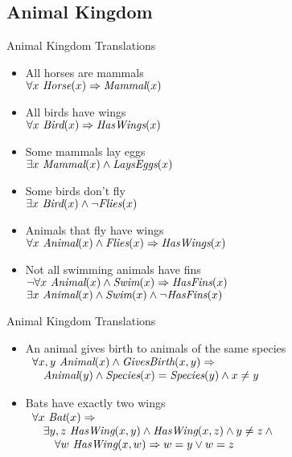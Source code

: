 \documentclass[12pt]{beamer}
\newcommand{\EM}[1]{\mbox{\em#1}}
\newcommand{\nl}{\vspace{1em}}
\newcommand{\limpl}{\Rightarrow}
\begin{document}
\subsection{Animal Kingdom}
\begin{frame}{Animal Kingdom Translations}
	\begin{itemize}
		\item
			All horses are mammals \\
			\pause
			$\forall x\ \EM{Horse}(x) \limpl \EM{Mammal}(x)$
		\pause
		\item
			All birds have wings \\
			\pause
			$\forall x\ \EM{Bird}(x) \limpl \EM{HasWings}(x)$
		\pause
		\item
			Some mammals lay eggs \\
			\pause
			$\exists x\ \EM{Mammal}(x) \land \EM{LaysEggs}(x)$
		\pause
		\item
			Some birds don't fly \\
			\pause
			$\exists x\ \EM{Bird}(x) \land \lnot\EM{Flies}(x)$
		\pause
		\item
			Animals that fly have wings \\
			\pause
			$\forall x\ \EM{Animal}(x) \land \EM{Flies}(x) \limpl \EM{HasWings}(x)$
		\pause
		\item
			Not all swimming animals have fins \\
			\pause
			$\lnot\forall x\ \EM{Animal}(x) \land \EM{Swim}(x) \limpl \EM{HasFins}(x)$
			\pause
			$\exists x\ \EM{Animal}(x) \land \EM{Swim}(x) \land \lnot\EM{HasFins}(x)$
	\end{itemize}
\end{frame}
\begin{frame}{Animal Kingdom Translations}
	\begin{itemize}
		\item
			An animal gives birth to animals of the same species \\
			\pause
			$
			\begin{array}{ll}
			\lefteqn{\forall x,y\ \EM{Animal}(x) \land \EM{GivesBirth}(x, y) \limpl \mbox{}} \\
			& \EM{Animal}(y) \land \EM{Species}(x) = \EM{Species}(y) \land x \neq y 
			\end{array}
			$
		\nl
		\pause
		\item
			Bats have exactly two wings \\
			\pause
			$
			\begin{array}{lll}
			\lefteqn{\forall x\ \EM{Bat}(x) \limpl \mbox{}} \\
			& \lefteqn{\exists y,z\ \EM{HasWing}(x, y) \land \EM{HasWing}(x, z) \land y \neq z \land \mbox{}} \\
			& & \forall w\ \EM{HasWing}(x, w) \limpl w = y \lor w = z
			\end{array}
			$
	\end{itemize}
\end{frame}
\end{document}
